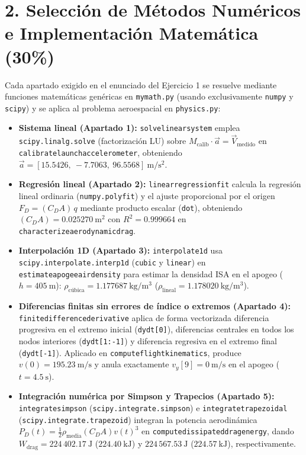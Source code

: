 \documentclass[10pt, a4paper]{article}
\renewcommand{\_}{\textunderscore\allowbreak}
\begin{document}
\section*{2. Selección de Métodos Numéricos e Implementación Matemática (30\%)}

Cada apartado exigido en el enunciado del Ejercicio 1 se resuelve mediante funciones matemáticas genéricas en \texttt{my\_math.py} (usando exclusivamente \texttt{numpy} y \texttt{scipy}) y se aplica al problema aeroespacial en \texttt{physics.py}:

\begin{itemize}
    \item \textbf{Sistema lineal (Apartado 1):} \texttt{solve\_linear\_system} emplea \texttt{scipy.linalg.solve} (factorización LU) sobre $M_{\text{calib}} \cdot \vec{a} = \vec{V}_{\text{medido}}$ en \texttt{calibrate\_launch\_accelerometer}, obteniendo $\vec{a} = [15.5426,\ -7.7063,\ 96.5568]\ \mathrm{m/s^2}$.
    \item \textbf{Regresión lineal (Apartado 2):} \texttt{linear\_regression\_fit} calcula la regresión lineal ordinaria (\texttt{numpy.polyfit}) y el ajuste proporcional por el origen $F_D = (C_D A)\,q$ mediante producto escalar (\texttt{dot}), obteniendo $(C_D A) = 0.025270\ \mathrm{m^2}$ con $R^2 = 0.999664$ en \texttt{characterize\_aerodynamic\_drag}.
    \item \textbf{Interpolación 1D (Apartado 3):} \texttt{interpolate\_1d} usa \texttt{scipy.interpolate.interp1d} (\texttt{cubic} y \texttt{linear}) en \texttt{estimate\_apogee\_air\_density} para estimar la densidad ISA en el apogeo ($h = 405\ \mathrm{m}$): $\rho_{\text{cúbica}} = 1.177687\ \mathrm{kg/m^3}$ ($\rho_{\text{lineal}} = 1.178020\ \mathrm{kg/m^3}$).
    \item \textbf{Diferencias finitas sin errores de índice o extremos (Apartado 4):} \texttt{finite\_difference\_derivative} aplica de forma vectorizada diferencia progresiva en el extremo inicial (\texttt{dy\_dt[0]}), diferencias centrales en todos los nodos interiores (\texttt{dy\_dt[1:-1]}) y diferencia regresiva en el extremo final (\texttt{dy\_dt[-1]}). Aplicado en \texttt{compute\_flight\_kinematics}, produce $v(0) = 195.23\ \mathrm{m/s}$ y anula exactamente $v_y[9] = 0\ \mathrm{m/s}$ en el apogeo ($t = 4.5\ \mathrm{s}$).
    \item \textbf{Integración numérica por Simpson y Trapecios (Apartado 5):} \texttt{integrate\_simpson} (\texttt{scipy.integrate.simpson}) e \texttt{integrate\_trapezoidal} (\texttt{scipy.integrate.trapezoid}) integran la potencia aerodinámica $P_D(t) = \frac{1}{2}\rho_{\text{media}}(C_D A)v(t)^3$ en \texttt{compute\_dissipated\_drag\_energy}, dando $W_{\text{drag}} = 224\,402.17\ \mathrm{J}$ ($224.40\ \mathrm{kJ}$) y $224\,567.53\ \mathrm{J}$ ($224.57\ \mathrm{kJ}$), respectivamente.

\end{itemize}
\end{document}
